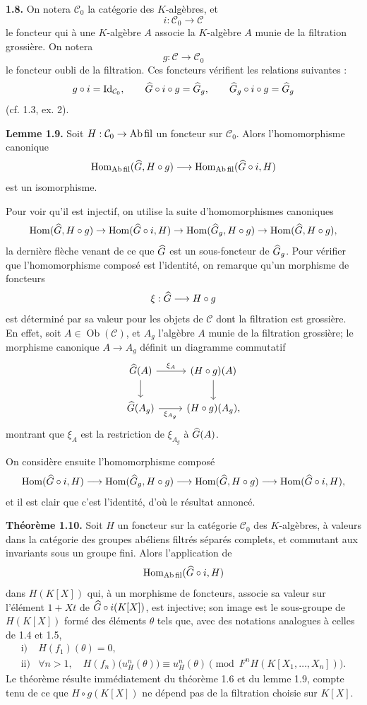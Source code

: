 \documentclass[11pt]{article}
\begin{document}
\textbf{1.8.} On notera \(\mathcal C_0\) la catégorie des \(K\)-algèbres, et
\[
  i:\mathcal C_0\longrightarrow \mathcal C
\]
le foncteur qui à une \(K\)-algèbre \(A\) associe la \(K\)-algèbre \(A\) munie de la filtration grossière. On notera
\[
  g:\mathcal C\longrightarrow\mathcal C_0
\]
le foncteur oubli de la filtration. Ces foncteurs vérifient les relations suivantes :
\[
  g\circ i=\operatorname{Id}_{\mathcal C_0},\qquad
  \widehat G\circ i\circ g=\widehat G_g,\qquad
  \widehat G_g\circ i\circ g=\widehat G_g
\]
(cf. 1.3, ex. 2).

\textbf{Lemme 1.9.} Soit \(H:\mathcal C_0\to\mathrm{Ab\,fil}\) un foncteur sur \(\mathcal C_0\). Alors l'homomorphisme canonique
\[
  \operatorname{Hom}_{\mathrm{Ab\,fil}}(\widehat G,H\circ g)
  \longrightarrow
  \operatorname{Hom}_{\mathrm{Ab\,fil}}(\widehat G\circ i,H)
\]
est un isomorphisme.

Pour voir qu'il est injectif, on utilise la suite d'homomorphismes canoniques
\[
  \operatorname{Hom}(\widehat G,H\circ g)\to
  \operatorname{Hom}(\widehat G\circ i,H)\to
  \operatorname{Hom}(\widehat G_g,H\circ g)\to
  \operatorname{Hom}(\widehat G,H\circ g),
\]
la dernière flèche venant de ce que \(\widehat G\) est un sous-foncteur de \(\widehat G_g\). Pour vérifier que l'homomorphisme composé est l'identité, on remarque qu'un morphisme de foncteurs
\[
  \xi:\widehat G\longrightarrow H\circ g
\]
est déterminé par sa valeur pour les objets de \(\mathcal C\) dont la filtration est grossière. En effet, soit \(A\in\operatorname{Ob}(\mathcal C)\), et \(A_g\) l'algèbre \(A\) munie de la filtration grossière; le morphisme canonique \(A\to A_g\) définit un diagramme commutatif
\[
\begin{tikzcd}
\Ghat(A) \arrow[r,"\xi_A"] \arrow[d] &
(H\circ g)(A) \arrow[d]\\
\Ghat(A_g) \arrow[r,"\xi_{A_g}"'] &
(H\circ g)(A_g),
\end{tikzcd}
\]
montrant que \(\xi_A\) est la restriction de \(\xi_{A_g}\) à \(\widehat G(A)\).

On considère ensuite l'homomorphisme composé
\[
  \operatorname{Hom}(\widehat G\circ i,H)\longrightarrow
  \operatorname{Hom}(\widehat G_g,H\circ g)\longrightarrow
  \operatorname{Hom}(\widehat G,H\circ g)\longrightarrow
  \operatorname{Hom}(\widehat G\circ i,H),
\]
et il est clair que c'est l'identité, d'où le résultat annoncé.

\textbf{Théorème 1.10.} Soit \(H\) un foncteur sur la catégorie \(\mathcal C_0\) des \(K\)-algèbres, à valeurs dans la catégorie des groupes abéliens filtrés séparés complets, et commutant aux invariants sous un groupe fini. Alors l'application de
\[
  \operatorname{Hom}_{\mathrm{Ab\,fil}}(\widehat G\circ i,H)
\]
dans \(H(K[X])\) qui, à un morphisme de foncteurs, associe sa valeur sur l'élément \(1+Xt\) de \(\widehat G\circ i(K[X])\), est injective; son image est le sous-groupe de \(H(K[X])\) formé des éléments \(\theta\) tels que, avec des notations analogues à celles de 1.4 et 1.5,
\[
\begin{array}{ll}
\text{i)}& H(f_1)(\theta)=0,\\[0.3em]
\text{ii)}& \forall n>1,\quad
H(f_n)\bigl(u_H^n(\theta)\bigr)\equiv u_H^n(\theta)
\pmod{F^nH(K[X_1,\ldots,X_n])}.
\end{array}
\]
Le théorème résulte immédiatement du théorème 1.6 et du lemme 1.9, compte tenu de ce que \(H\circ g(K[X])\) ne dépend pas de la filtration choisie sur \(K[X]\).
\end{document}
